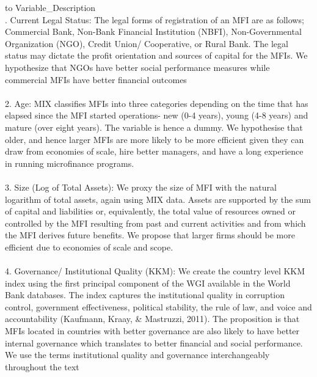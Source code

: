 \documentclass[a4paper, nobind]{templates/ociamthesis}
\begin{document}
\begin{table}

\caption{\label{tab:unnamed-chunk-116}Description of Independent Variables}
\centering
\fontsize{9}{11}\selectfont
\begin{tabu} to 
\toprule
Variable\_Description\\
. Current Legal Status: The legal forms of registration of an MFI are as follows; Commercial Bank, Non-Bank Financial Institution (NBFI), Non-Governmental Organization (NGO), Credit Union/ Cooperative, or Rural Bank. The legal status may dictate the profit orientation and sources of capital for the MFIs. We hypothesize that NGOs have better social performance measures while commercial MFIs have better financial outcomes\\
\\
2.  Age: MIX classifies MFIs into three categories depending on the time that has elapsed since the MFI started operations- new (0-4 years), young (4-8 years) and mature (over eight years). The variable is hence a dummy. We hypothesise that older, and hence larger MFIs are more likely to be more efficient given they can draw from economies of scale, hire better managers, and have a long experience in running microfinance programs.\\
\\
3. Size (Log of Total Assets): We proxy the size of MFI with the natural logarithm of total assets, again using MIX data. Assets are supported by the sum of capital and liabilities or, equivalently, the total value of resources owned or controlled by the MFI resulting from past and current activities and from which the MFI derives future benefits. We propose that larger firms should be more efficient due to economies of scale and scope.\\
\addlinespace
\\
4. Governance/ Institutional Quality (KKM): We create the country level KKM index using the first principal component of the WGI available in the World Bank databases. The index captures the institutional quality in corruption control, government effectiveness, political stability, the rule of law, and voice and accountability (Kaufmann, Kraay, \& Mastruzzi, 2011). The proposition is that MFIs located in countries with better governance are also likely to have better internal governance which translates to better financial and social performance. We use the terms institutional quality and governance interchangeably throughout the text\\

\end{tabu}
\end{table}
\end{document}
